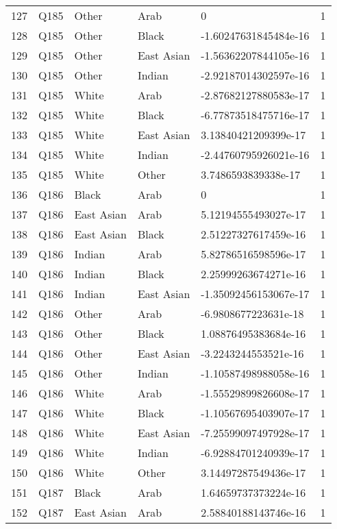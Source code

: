 \documentclass{amsart}
\begin{document}
\begin{longtable}{rlllll}
  127 & Q185 & Other & Arab & 0 & 1 \\ 
  128 & Q185 & Other & Black & -1.60247631845484e-16 & 1 \\ 
  129 & Q185 & Other & East Asian & -1.56362207844105e-16 & 1 \\ 
  130 & Q185 & Other & Indian & -2.92187014302597e-16 & 1 \\ 
  131 & Q185 & White & Arab & -2.87682127880583e-17 & 1 \\ 
  132 & Q185 & White & Black & -6.77873518475716e-17 & 1 \\ 
  133 & Q185 & White & East Asian & 3.13840421209399e-17 & 1 \\ 
  134 & Q185 & White & Indian & -2.44760795926021e-16 & 1 \\ 
  135 & Q185 & White & Other & 3.7486593839338e-17 & 1 \\ 
  136 & Q186 & Black & Arab & 0 & 1 \\ 
  137 & Q186 & East Asian & Arab & 5.12194555493027e-17 & 1 \\ 
  138 & Q186 & East Asian & Black & 2.51227327617459e-16 & 1 \\ 
  139 & Q186 & Indian & Arab & 5.82786516598596e-17 & 1 \\ 
  140 & Q186 & Indian & Black & 2.25999263674271e-16 & 1 \\ 
  141 & Q186 & Indian & East Asian & -1.35092456153067e-17 & 1 \\ 
  142 & Q186 & Other & Arab & -6.9808677223631e-18 & 1 \\ 
  143 & Q186 & Other & Black & 1.08876495383684e-16 & 1 \\ 
  144 & Q186 & Other & East Asian & -3.2243244553521e-16 & 1 \\ 
  145 & Q186 & Other & Indian & -1.10587498988058e-16 & 1 \\ 
  146 & Q186 & White & Arab & -1.55529899826608e-17 & 1 \\ 
  147 & Q186 & White & Black & -1.10567695403907e-17 & 1 \\ 
  148 & Q186 & White & East Asian & -7.25599097497928e-17 & 1 \\ 
  149 & Q186 & White & Indian & -6.92884701240939e-17 & 1 \\ 
  150 & Q186 & White & Other & 3.14497287549436e-17 & 1 \\ 
  151 & Q187 & Black & Arab & 1.64659737373224e-16 & 1 \\ 
  152 & Q187 & East Asian & Arab & 2.58840188143746e-16 & 1 \\ 

\end{longtable}
\end{document}

